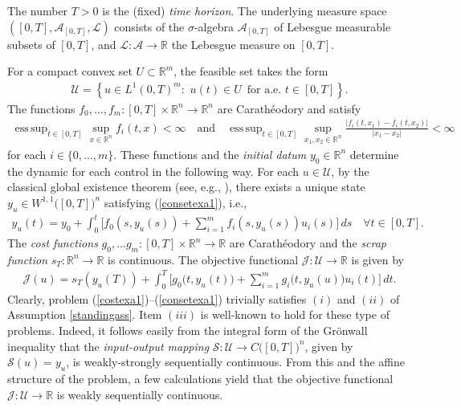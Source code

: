 \documentclass[hidelinks,onefignum,onetabnum]{siamart220329}
\DeclareMathOperator*{\esssup}{ess\,sup}
\begin{document}
The number $T>0$ is the (fixed) \textit{time horizon}.  The underlying measure space $([0,T],\mathcal A_{[0,T]}, \mathcal L)$ consists of the $\sigma$-algebra $\mathcal A_{[0,T]}$  of Lebesgue measurable subsets of $[0,T]$, and $\mathcal L:\mathcal A\to\mathbb R$ the Lebesgue measure on $[0,T]$. 

For a compact convex set $U\subset\mathbb R^m$, the feasible set takes the form
\begin{align*}
	\mathcal U=\left\lbrace u \in L^1(0,T)^m :\,\, u(t)\in U\,\,\, \text{for a.e. $t\in[0,T]$} \right\rbrace.
\end{align*}
The functions $f_0,\dots,f_m:[0,T]\times\mathbb R^n\to \mathbb R^n$ are Carath\' eodory and satisfy
\begin{align*}
	 \esssup_{t\in[0,T]}\sup_{x\in\mathbb R^n}f_i(t,x)<\infty\quad\text{and}\quad\esssup_{t\in[0,T]}\sup_{x_1,x_2\in\mathbb R^n}\frac{|f_{i}(t,x_1)-f_{i}(t,x_2)|}{|x_1-x_2|}<\infty
\end{align*}
for each $i\in\{0,\dots,m\}$.
 These functions and the \textit{initial datum} $y_0\in\mathbb R^n$ determine the dynamic for each control in the following way. For each $u\in\mathcal U$, by the classical global existence theorem (see, e.g., \cite[Theorem 2.1.1]{Bressan}),  there exists a unique state $y_u\in W^{1,1}\big([0,T]\big)^n$ satisfying (\ref{consetexa1}), i.e., 
 \begin{align*}
 	y_{u}(t)=y_0+\int_{0}^t\Big[f_0(s,y_{u}(s))+\sum_{i=1}^mf_i(s,y_{u}(s)) u_i(s)\Big]\, ds\quad \forall t\in[0,T].
 \end{align*}
The  \textit{cost functions} $g_0,\dots g_m:[0,T]\times\mathbb R^n\to\mathbb R$ are Carath\' eodory and the \textit{scrap function} $s_T:\mathbb R^n\to \mathbb R$ is continuous.
The objective functional $\mathcal J:\mathcal U\to\mathbb R$ is given by
\begin{align*}
		\mathcal J(u)= s_T(y_{u}(T))+\int_{0}^T\Big[g_0\big(t,y_{u}(t)\big)+\sum_{i=1}^m g_i\big(t,y_{u}(u)\big) u_i(t)\Big]\, dt.
\end{align*}
Clearly, problem (\ref{costexa1})--(\ref{consetexa1})  trivially satisfies $(i)$ and $(ii)$ of Assumption \ref{standingass}. Item $(iii)$ is well-known to hold for these type of problems. Indeed, it follows easily from the integral form of the  Gr\"onwall inequality that the  \textit{input-output mapping}  $\mathcal S:\mathcal U\to C\big([0,T]\big)^n$, given by $\mathcal S(u)=y_u$, is weakly-strongly sequentially continuous. From this and the affine structure of the problem, a few calculations yield that the objective functional $\mathcal J:\mathcal U\to\mathbb R$ is weakly sequentially continuous.
\end{document}
